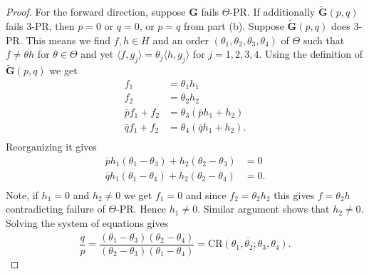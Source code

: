 \documentclass[reqno,a4paper,11pt]{amsart}
\numberwithin{equation}{section}
\newcommand\1{\mathds{1}}
\newcommand{\cratio}{{\mathrm{CR}}}
\begin{document}
\begin{proof}
    For the forward direction, suppose $\mathbf{G}$ fails $\Theta$-PR. If additionally $\tilde{\mathbf{G}}(p,q)$ fails $3$-PR, then $p=0$ or $q=0$, or $p=q$ from part (b). Suppose $\tilde{\mathbf{G}}(p,q)$ does $3$-PR. This means we find $f,h\in H$ and an order $(\theta_1,\theta_2,\theta_3,\theta_4)$ of $\Theta$ such that $f\neq \theta h$ for $\theta \in \Theta$ and yet $\langle f,g_j\rangle = \theta_j\langle h,g_j\rangle$ for $j=1,2,3,4$. Using the definition of $\tilde{\mathbf{G}}(p,q)$ we get
    \begin{align}
        f_1 &= \theta_1 h_1\\
        f_2 &=\theta_2 h_2\\
        \overline{p}f_1 + f_2 &= \theta_3(\overline{p}h_1+h_2)\\
        \overline{q}f_1 + f_2 &= \theta_4(\overline{q}h_1+h_2).\\
    \end{align} 
    Reorganizing it gives 
        \begin{align}
        \overline{p}h_1(\theta_1-\theta_3) + h_2(\theta_2-
        \theta_3)&= 0\\
        \overline{q}h_1(\theta_1-\theta_4) + h_2(\theta_2-
        \theta_4)&= 0.\\
    \end{align}
    Note, if $h_1=0$ and $h_2\neq 0$ we get $f_1=0$ and since $f_2=\theta_2h_2$ this gives $f=\theta_2h$ contradicting failure of $\Theta$-PR. Hence $h_1\neq 0$. Similar argument shows that $h_2\neq 0$. Solving the system of equations gives 
            $$\frac{q}{p} = \overline{\frac{(\theta_1-\theta_3)(\theta_2-\theta_4)}{(\theta_2-\theta_3)(\theta_1-\theta_4)}} = \overline{\cratio(\theta_1,\theta_2;\theta_3,\theta_4)}.$$ 


\end{proof}
\end{document}
